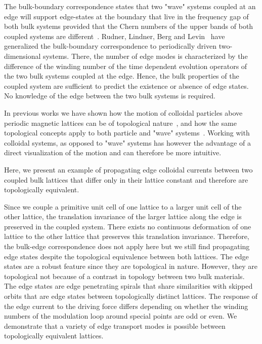 \documentclass[12pt]{iopart}
\begin{document}
The bulk-boundary correspondence states that two "wave" systems coupled at an edge will support edge-states
at the boundary that live in the frequency gap of both bulk systems provided that the Chern numbers
of the upper bands of both coupled systems are different~\cite{Hasan}. Rudner, Lindner, Berg and Levin~\cite{Rudner}
have generalized the bulk-boundary correspondence to periodically driven two-dimensional systems. There, 
the number of edge modes is characterized by the difference of the winding number of the time dependent
evolution operators of the two bulk systems coupled at the edge. Hence, the bulk properties of the coupled
system are sufficient to predict the existence or absence of edge states. No knowledge of the edge between the two bulk systems
is required.


In previous works we have shown how the motion of colloidal particles above periodic magnetic lattices
can be of topological nature~\cite{tp1,tp2,tp3,colloidalTI}, and how the same topological concepts apply
to both particle and "wave" systems~\cite{Rechtsman,Perczel,Kane,Mao,Paulose,Nash,Huber,Murugan}.
Working with colloidal systems, as opposed to "wave" systems has however the advantage of a direct visualization of the motion 
and can therefore be more intuitive. 

Here, we present an example of propagating edge colloidal currents between two
coupled bulk lattices that differ only in their lattice constant and therefore are
topologically equivalent.


Since we couple a primitive unit cell of one
lattice to a larger unit cell of the other lattice, the translation invariance of the larger lattice along the edge
is preserved in the coupled system. There exists no continuous deformation of one lattice to the other lattice that
preserves this translation invariance. Therefore, the bulk-edge correspondence does not apply here but we still find
propagating edge states despite the topological equivalence between both lattices. The edge states are a robust
feature since they are topological in nature. However, they are topological not because of a contrast in topology
between two bulk materials. The edge states are edge penetrating spirals that share similarities with skipped
orbits \cite{Beenakker,Davies,Shi,Montambaux,Zhirov,Mancini,colloidalTI} that are edge states between topologically
distinct lattices. The response of the edge current to the driving force differs depending on whether the winding numbers of the 
modulation loop around special points are odd or even. We demonstrate that a variety of edge
transport modes is possible between topologically equivalent lattices.
\end{document}
